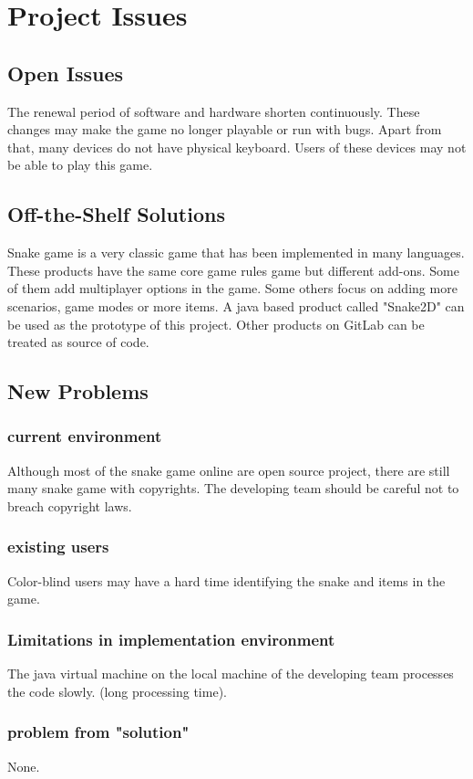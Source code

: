 \documentclass[12pt, titlepage]{article}
\begin{document}
\section{Project Issues}

\subsection{Open Issues}
    The renewal period of software and hardware shorten continuously. These changes may make the game no longer playable or run with bugs. Apart from that, many devices do not have physical keyboard. Users of these devices may not be able to play this game.
\subsection{Off-the-Shelf Solutions}
    Snake game is a very classic game that has been implemented in many languages. These products have the same core game rules game but different add-ons. Some of them add multiplayer options in the game. Some others focus on adding more scenarios, game modes or more items. A java based product called "Snake2D" can be used as the prototype of this project. Other products on GitLab can be treated as source of code.
\subsection{New Problems}
\subsubsection{current environment}
    Although most of the snake game online are open source project, there are still many snake game with copyrights. The developing team should be careful not to breach copyright laws.
\subsubsection{existing users}
    Color-blind users may have a hard time identifying the snake and items in the game.
\subsubsection{Limitations in implementation environment}
    The java virtual machine on the local machine of the developing team processes the code slowly. (long processing time).
\subsubsection{problem from "solution"}
    None.
\end{document}
